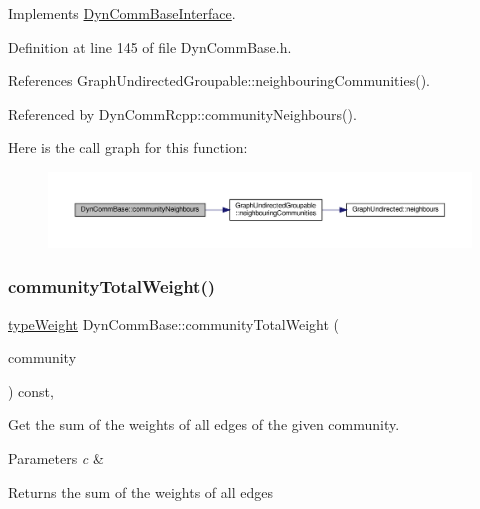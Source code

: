Implements \hyperlink{classDynCommBaseInterface_afbae10b36098f57576378255d9c09faf}{Dyn\+Comm\+Base\+Interface}.



Definition at line 145 of file Dyn\+Comm\+Base.\+h.



References Graph\+Undirected\+Groupable\+::neighbouring\+Communities().



Referenced by Dyn\+Comm\+Rcpp\+::community\+Neighbours().

Here is the call graph for this function\+:
\nopagebreak
\begin{figure}[H]
\begin{center}
\leavevmode
\includegraphics[width=350pt]{classDynCommBase_aba6f1f0fdd67a1d7f546d63706a60cde_cgraph}
\end{center}
\end{figure}
\mbox{\label{classDynCommBase_a9e7f2493dd9f2381dbfbe94b91ac49f4}} 
\subsubsection{\texorpdfstring{community\+Total\+Weight()}{communityTotalWeight()}}
{\footnotesize\ttfamily \hyperlink{edge_8h_a2e7ea3be891ac8b52f749ec73fee6dd2}{type\+Weight} Dyn\+Comm\+Base\+::community\+Total\+Weight (\begin{DoxyParamCaption}\item[{\hyperlink{graphUndirectedGroupable_8h_a914da95c9ea7f14f4b7f875c36818556}{type\+Community}}]{community }\end{DoxyParamCaption}) const\hspace{0.3cm}{\ttfamily [inline]}, {\ttfamily [virtual]}}

Get the sum of the weights of all edges of the given community.


\begin{DoxyParams}{Parameters}
{\em c} & \\
\hline
\end{DoxyParams}
\begin{DoxyReturn}{Returns}
the sum of the weights of all edges 
\end{DoxyReturn}


